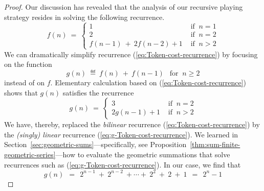 \begin{proof}
Our discussion has revealed that the analysis of our recursive playing
strategy resides in solving the following recurrence.
\begin{equation}
\label{eq:Token-cost-recurrence}
f(n) \ = \ \left\{
\begin{array}{ll}
1 & \mbox{ if } \ n=1 \\
2 & \mbox{ if } \ n=2 \\
f(n-1) \ + \ 2 f(n-2) + 1 & \mbox{ if } \  n > 2
\end{array}
\right.
\end{equation}
We can dramatically simplify recurrence
(\ref{eq:Token-cost-recurrence}) by focusing on the function
\[ g(n) \ \eqdef \ f(n) \ + \ f(n-1) \ \ \mbox{ for } \ n \geq 2 \]
instead of on $f$.  Elementary calculation based on
(\ref{eq:Token-cost-recurrence}) shows that $g(n)$ satisfies the
recurrence
\begin{equation}
\label{eq:g-Token-cost-recurrence}
g(n) \ = \ \left\{
\begin{array}{ll}
3 & \mbox{ if } \ n=2 \\
2 g(n-1) + 1 & \mbox{ if } \  n > 2
\end{array}
\right.
\end{equation}
We have, thereby, replaced the {\em bilinear} recurrence
(\ref{eq:Token-cost-recurrence}) by the {\em (singly) linear}
recurrence (\ref{eq:g-Token-cost-recurrence}).  We learned in
Section~\ref{sec:geometric-sums}---specifically, see
Proposition~\ref{thm:sum-finite-geometric-series}---how to evaluate
the geometric summations that solve recurrences such as
(\ref{eq:g-Token-cost-recurrence}).  In our case, we find that
%
\begin{equation}
\label{eq:VALUE-g-Token-cost}
g(n) \ \ = \ \ 2^{n-1} \ + \ 2^{n-2} \ + \cdots + \ 2^2 \ + \ 2 \ +
\ 1 \ \ = \ \ 2^{n} -1
\end{equation}
%

\medskip


\end{proof}
